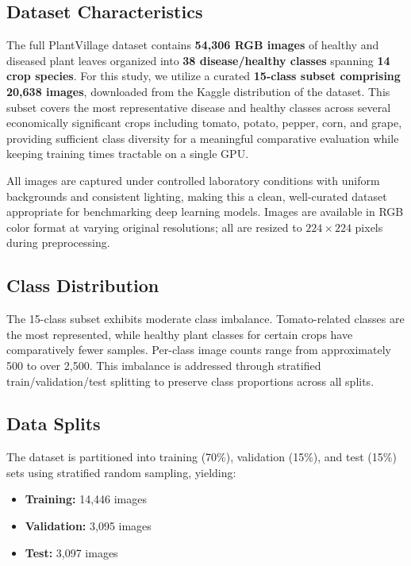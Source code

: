 \documentclass[10pt,twocolumn]{article}
\begin{document}
\subsection{Dataset Characteristics}

The full PlantVillage dataset contains \textbf{54,306 RGB images} of healthy and diseased plant leaves organized into \textbf{38 disease/healthy classes} spanning \textbf{14 crop species}. For this study, we utilize a curated \textbf{15-class subset comprising 20,638 images}, downloaded from the Kaggle distribution of the dataset. This subset covers the most representative disease and healthy classes across several economically significant crops including tomato, potato, pepper, corn, and grape, providing sufficient class diversity for a meaningful comparative evaluation while keeping training times tractable on a single GPU.

All images are captured under controlled laboratory conditions with uniform backgrounds and consistent lighting, making this a clean, well-curated dataset appropriate for benchmarking deep learning models. Images are available in RGB color format at varying original resolutions; all are resized to $224 \times 224$ pixels during preprocessing.

\subsection{Class Distribution}

The 15-class subset exhibits moderate class imbalance. Tomato-related classes are the most represented, while healthy plant classes for certain crops have comparatively fewer samples. Per-class image counts range from approximately 500 to over 2,500. This imbalance is addressed through stratified train/validation/test splitting to preserve class proportions across all splits.

\subsection{Data Splits}

The dataset is partitioned into training (70\%), validation (15\%), and test (15\%) sets using stratified random sampling, yielding:
\begin{itemize}
  \item \textbf{Training:} 14,446 images
  \item \textbf{Validation:} 3,095 images
  \item \textbf{Test:} 3,097 images
\end{itemize}
\end{document}
